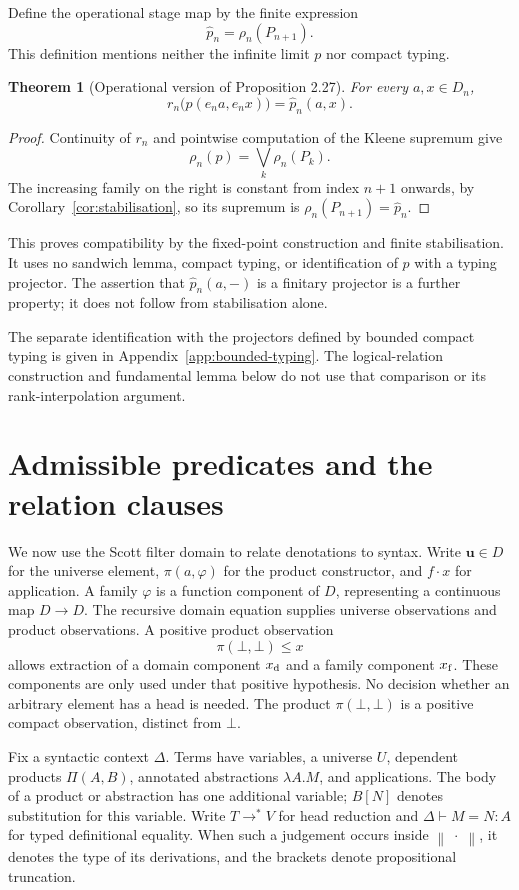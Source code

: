 \documentclass[11pt,a4paper]{article}
\newtheorem{theorem}{Theorem}[section]
\theoremstyle{definition}
\theoremstyle{remark}
\newcommand{\trunc}[1]{\left\lVert #1\right\rVert}
\newcommand{\appl}{\mathbin{\cdot}}
\begin{document}
Define the operational stage map by the finite expression
\[
 \widehat p_n=\rho_n(P_{n+1}).
\]
This definition mentions neither the infinite limit $p$ nor compact
typing.

\begin{theorem}[Operational version of Proposition 2.27]\label{thm:operational}
For every $a,x\in D_n$,
\[
 r_n\bigl(p(e_n a,e_n x)\bigr)=\widehat p_n(a,x).
\]
\end{theorem}
\begin{proof}
Continuity of $r_n$ and pointwise computation of the Kleene supremum give
\[
 \rho_n(p)=\bigvee_k\rho_n(P_k).
\]
The increasing family on the right is constant from index $n+1$ onwards,
by Corollary~\ref{cor:stabilisation}, so its supremum is
$\rho_n(P_{n+1})=\widehat p_n$.
\end{proof}

This proves compatibility by the fixed-point construction and finite
stabilisation. It uses no sandwich lemma, compact typing, or
identification of $p$ with a typing projector. The assertion that
$\widehat p_n(a,-)$ is a finitary projector is a further property; it
does not follow from stabilisation alone.

The separate identification with the projectors defined by bounded
compact typing is given in Appendix~\ref{app:bounded-typing}. The
logical-relation construction and fundamental lemma below do not use
that comparison or its rank-interpolation argument.

\section{Admissible predicates and the relation clauses}

We now use the Scott filter domain to relate denotations to syntax.
Write $\mathbf u\in D$ for the universe element,
$\pi(a,\varphi)$ for the product constructor, and $f\appl x$ for
application. A family $\varphi$ is a function component of $D$, representing
a continuous map $D\to D$. The recursive domain equation supplies
universe observations and product observations. A positive product
observation
\[
 \pi(\bot,\bot)\leq x
\]
allows extraction of a domain component $x_{\rm d}$ and a family
component $x_{\rm f}$. These components are only used under that positive
hypothesis. No decision whether an arbitrary element has a head is needed.
The product $\pi(\bot,\bot)$ is a positive compact observation, distinct
from $\bot$.

Fix a syntactic context $\Delta$. Terms have variables, a universe $U$,
dependent products $\Pi(A,B)$, annotated abstractions $\lambda A.M$, and
applications. The body of a product or abstraction has one additional
variable; $B[N]$ denotes substitution for this variable. Write
$T\longrightarrow^* V$ for head reduction and
$\Delta\vdash M=N:A$ for typed definitional equality. When such a
judgement occurs inside $\trunc{\;\cdot\;}$, it denotes the type of its
derivations, and the brackets denote propositional truncation.
\end{document}
